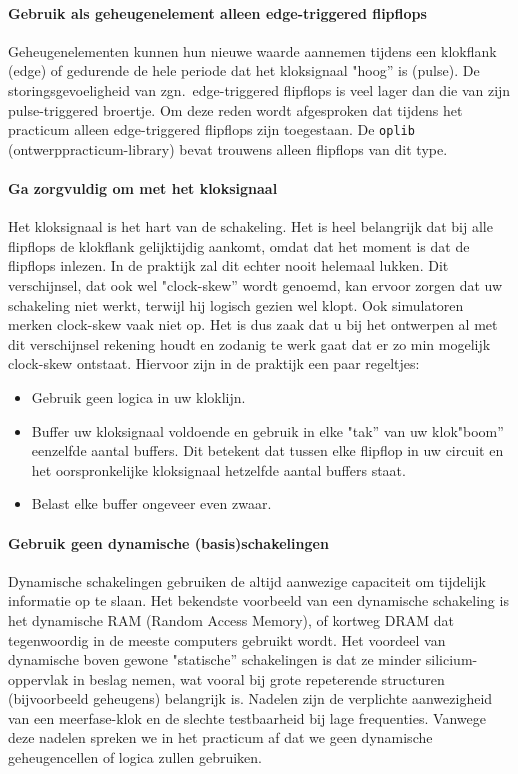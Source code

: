\paragraph{Gebruik als geheugenelement alleen edge-triggered flipflops}
Geheugenelementen kunnen hun nieuwe waarde aannemen tijdens een klokflank (edge)
of gedurende de hele periode dat het kloksignaal "hoog'' is (pulse).
De storingsgevoeligheid van zgn.\ edge-triggered flipflops is veel lager dan die van zijn pulse-triggered broertje.
Om deze reden wordt afgesproken dat tijdens het practicum alleen edge-triggered flipflops zijn toegestaan.
De {\tt oplib} (ontwerppracticum-library) bevat trouwens alleen flipflops van dit type.

\paragraph{Ga zorgvuldig om met het kloksignaal}
Het kloksignaal is het hart van de schakeling. 
Het is heel belangrijk dat bij alle flipflops de klokflank gelijktijdig aankomt, 
omdat dat het moment is dat de flipflops inlezen. 
In de praktijk zal dit echter nooit helemaal lukken.
Dit verschijnsel, dat ook wel "clock-skew''  wordt genoemd, 
kan ervoor zorgen dat uw schakeling niet werkt, terwijl hij logisch gezien wel klopt. 
Ook simulatoren merken clock-skew vaak niet op. 
Het is dus zaak dat u bij het ontwerpen al met dit verschijnsel rekening houdt en zodanig te werk 
gaat dat er zo min mogelijk clock-skew ontstaat. 
Hiervoor zijn in de praktijk een paar regeltjes:
\begin {itemize}
\item
Gebruik geen logica in uw kloklijn.
\item
Buffer uw kloksignaal voldoende en gebruik in elke "tak'' van uw klok"boom'' eenzelfde aantal buffers.
Dit betekent dat tussen elke flipflop in uw circuit en het oorspronkelijke kloksignaal hetzelfde aantal buffers staat. 
\item
Belast elke buffer ongeveer even zwaar. 
\end{itemize}

\paragraph{Gebruik geen dynamische (basis)schakelingen}
Dynamische schakelingen gebruiken de altijd aanwezige capaciteit om tijdelijk informatie op te slaan.
Het bekendste voorbeeld van een dynamische schakeling is het dynamische RAM (Random Access Memory),
of kortweg DRAM dat tegenwoordig in de meeste computers gebruikt wordt.
Het voordeel van dynamische boven gewone "statische'' schakelingen is dat ze minder silicium-oppervlak in beslag nemen,
wat vooral bij grote repeterende structuren (bijvoorbeeld geheugens) belangrijk is.
Nadelen zijn de verplichte aanwezigheid van een meerfase-klok en de slechte testbaarheid bij lage frequenties.
Vanwege deze nadelen spreken we in het practicum af dat we geen dynamische geheugencellen of logica zullen gebruiken.

